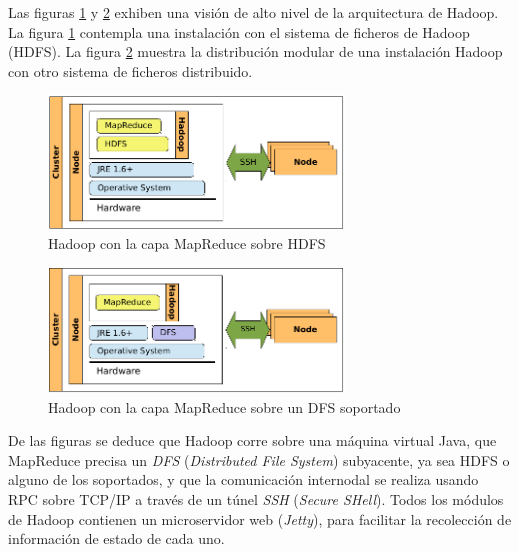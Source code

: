 Las figuras \ref{fig:hadoopmapredhdfs} y \ref{fig:hadoopmapreddfs} exhiben una visi\'on de alto nivel de la arquitectura de Hadoop. La figura \ref{fig:hadoopmapredhdfs} contempla una instalaci\'on con el sistema de ficheros de Hadoop (HDFS). La figura \ref{fig:hadoopmapreddfs} muestra la distribuci\'on modular de una instalaci\'on Hadoop con otro sistema de ficheros distribuido. \newline

\begin{figure}[tbp]
\begin{center}
\includegraphics[width=0.7\textwidth]{imagenes/015.pdf}
 \caption{Hadoop con la capa MapReduce sobre HDFS}
\label{fig:hadoopmapredhdfs}
\end{center}
\end{figure}

\begin{figure}[tbp]
\begin{center}
\includegraphics[width=0.7\textwidth]{imagenes/016.pdf}
 \caption{Hadoop con la capa MapReduce sobre un DFS soportado}
\label{fig:hadoopmapreddfs}
\end{center}
\end{figure}

De las figuras se deduce que Hadoop corre sobre una m\'aquina virtual Java, que MapReduce precisa un \emph{DFS} (\emph{Distributed File System}) subyacente, ya sea HDFS o alguno de los soportados, y que la comunicaci\'on internodal se realiza usando RPC sobre TCP/IP a trav\'es de un t\'unel \emph{SSH} (\emph{Secure SHell}). Todos los m\'odulos de Hadoop contienen un microservidor web (\emph{Jetty}), para facilitar la recolecci\'on de informaci\'on de estado de cada uno.




